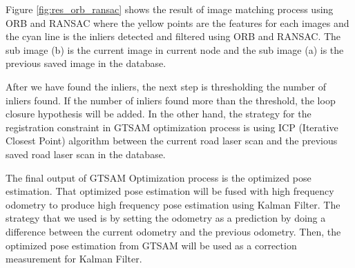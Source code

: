 {    Figure \ref{fig:res_orb_ransac} shows the result of image matching process using ORB and RANSAC where the yellow points are the features for each images and the cyan line is the inliers detected and filtered using ORB and RANSAC. The sub image (b) is the current image in current node and the sub image (a) is the previous saved image in the database. 

    \par   
    After we have found the inliers, the next step is thresholding the number of inliers found. If the number of inliers found more than the threshold, the loop closure hypothesis will be added. In the other hand, the strategy for the registration constraint in GTSAM optimization process is using ICP (Iterative Closest Point) algorithm between the current road laser scan and the previous saved road laser scan in the database. 

    \par    
    The final output of GTSAM Optimization process is the optimized pose estimation. That optimized pose estimation will be fused with high frequency odometry to produce high frequency pose estimation using Kalman Filter. The strategy that we used is by setting the odometry as a prediction by doing a difference between the current odometry and the previous odometry. Then, the optimized pose estimation from GTSAM will be used as a correction measurement for Kalman Filter.
}


